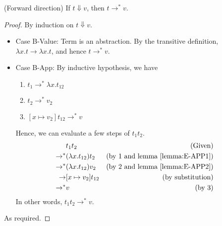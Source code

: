 \documentclass[12pt]{article}
\begin{document}
\begin{claim}
(Forward direction) If $t \Downarrow v$, then $t \rightarrow^* v$.
\end{claim}
\begin{proof}
By induction on $t \Downarrow v$.
\begin{itemize}
\item
Case B-Value:
Term is an abstraction.
By the transitive definition, $\lambda x . t \rightarrow \lambda x . t$, and hence $t \rightarrow^* v$.
\item
Case B-App: 
By inductive hypothesis, we have
\begin{enumerate}
\item
$t_1 \rightarrow^* \lambda x . t_{12}$
\item
$t_2 \rightarrow^* v_2$
\item
$[x \mapsto v_2] t_{12} \rightarrow^* v$
\end{enumerate}
Hence, we can evaluate a few steps of $t_1t_2$.
\begin{align*}
& t_1t_2 & \text{(Given)} \\
\rightarrow^* & (\lambda x . t_{12}) t_2 & \text{(by 1 and lemma \ref{lemma:E-APP1})}\\
\rightarrow^* & (\lambda x . t_{12}) v_2 & \text{(by 2 and lemma \ref{lemma:E-APP2})}\\
\rightarrow & [x \mapsto v_2] t_{12} & \text{(by substitution)} \\
\rightarrow^* & v & \text{(by 3)}
\end{align*}
In other words, $t_1t_2 \rightarrow^* v$.
\end{itemize}
As required.
\end{proof}
\end{document}
